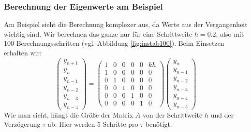 \subsubsection{Berechnung der Eigenwerte am Beispiel}
Am Beispiel sieht die Berechnung komplexer aus, da Werte aus der Vergangenheit wichtig sind.
Wir berechnen das ganze nur für eine Schrittweite $h=0.2$, also mit 100 Berechnungsschritten (vgl. Abbildung \ref{fig:instab100}).
Beim Einsetzen erhalten wir: 
\begin{equation}
	\left( \begin{array}{c}y_{n+1} \\ y_n \\ y_{n-1} \\ y_{n-2} \\ y_{n-3} \\ y_{n-4}\end{array} \right) =
	\begin{pmatrix} 
	1 & 0 & 0 & 0 & 0 & kh \\
	1 & 0 & 0 & 0 & 0 & 0 \\
	0 & 1 & 0 & 0 & 0 & 0 \\
	0 & 0 & 1 & 0 & 0 & 0 \\
	0 & 0 & 0 & 1 & 0 & 0 \\
	0 & 0 & 0 & 0 & 1 & 0
	\end{pmatrix}
	\left( \begin{array}{c}y_{n} \\ y_{n-1} \\ y_{n-2} \\ y_{n-3} \\ y_{n-4} \\y_{n-5} \end{array} \right)
\end{equation}
Wie man sieht, hängt die Größe der Matrix $A$ von der Schrittweite $h$ und der Verzögerung $\tau$ ab.
Hier werden 5 Schritte pro $\tau$ benötigt.
 
